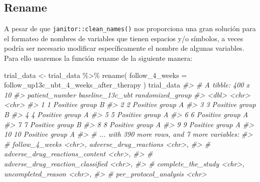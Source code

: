\documentclass[
]{book}
\newenvironment{Shaded}{\begin{snugshade}}{\end{snugshade}}
\newcommand{\AttributeTok}[1]{\textcolor[rgb]{0.77,0.63,0.00}{#1}}
\newcommand{\CommentTok}[1]{\textcolor[rgb]{0.56,0.35,0.01}{\textit{#1}}}
\newcommand{\FunctionTok}[1]{\textcolor[rgb]{0.00,0.00,0.00}{#1}}
\newcommand{\NormalTok}[1]{#1}
\newcommand{\OtherTok}[1]{\textcolor[rgb]{0.56,0.35,0.01}{#1}}
\newcommand{\SpecialCharTok}[1]{\textcolor[rgb]{0.00,0.00,0.00}{#1}}
\begin{document}
\hypertarget{rename}{%
\subsection{Rename}\label{rename}}

A pesar de que \texttt{janitor::clean\_names()} nos proporciona una gran solución para el formateo de nombres de variables que tienen espacios y/o símbolos, a veces podría ser necesario modificar específicamente el nombre de algunas variables. Para ello usaremos la función rename de la siguiente manera:

\begin{Shaded}
\begin{Highlighting}[]
\NormalTok{trial\_data }\OtherTok{\textless{}{-}}\NormalTok{ trial\_data }\SpecialCharTok{\%\textgreater{}\%} 
  \FunctionTok{rename}\NormalTok{(}
    \AttributeTok{follow\_4\_weeks =}\NormalTok{ follow\_up13c\_ubt\_4\_weeks\_after\_therapy}
\NormalTok{  )}
\NormalTok{trial\_data}
\CommentTok{\#\textgreater{} \# A tibble: 400 x 10}
\CommentTok{\#\textgreater{}    patient\_number baseline\_13c\_ubt randomized\_group}
\CommentTok{\#\textgreater{}             \textless{}dbl\textgreater{} \textless{}chr\textgreater{}            \textless{}chr\textgreater{}           }
\CommentTok{\#\textgreater{}  1              1 Positive         group B         }
\CommentTok{\#\textgreater{}  2              2 Positive         group A         }
\CommentTok{\#\textgreater{}  3              3 Positive         group B         }
\CommentTok{\#\textgreater{}  4              4 Positive         group A         }
\CommentTok{\#\textgreater{}  5              5 Positive         group A         }
\CommentTok{\#\textgreater{}  6              6 Positive         group A         }
\CommentTok{\#\textgreater{}  7              7 Positive         group B         }
\CommentTok{\#\textgreater{}  8              8 Positive         group A         }
\CommentTok{\#\textgreater{}  9              9 Positive         group A         }
\CommentTok{\#\textgreater{} 10             10 Positive         group A         }
\CommentTok{\#\textgreater{} \# ... with 390 more rows, and 7 more variables:}
\CommentTok{\#\textgreater{} \#   follow\_4\_weeks \textless{}chr\textgreater{}, adverse\_drug\_reactions \textless{}chr\textgreater{},}
\CommentTok{\#\textgreater{} \#   adverse\_drug\_reactions\_content \textless{}chr\textgreater{},}
\CommentTok{\#\textgreater{} \#   adverse\_drug\_reaction\_classified \textless{}chr\textgreater{},}
\CommentTok{\#\textgreater{} \#   complete\_the\_study \textless{}chr\textgreater{}, uncompleted\_reason \textless{}chr\textgreater{},}
\CommentTok{\#\textgreater{} \#   per\_protocol\_analysis \textless{}chr\textgreater{}}
\end{Highlighting}
\end{Shaded}
\end{document}
